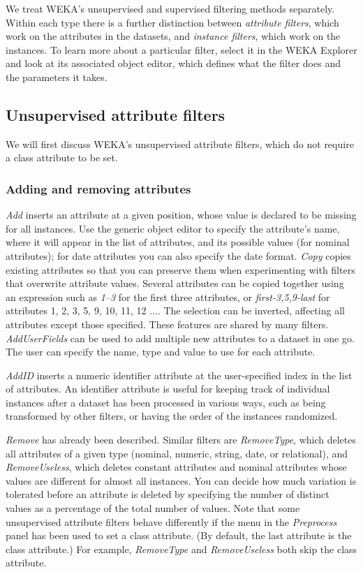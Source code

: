 We treat WEKA's unsupervised and supervised filtering methods
separately. Within each type there is a further distinction between
\textit{attribute filters}, which work on the attributes in the
datasets, and \textit{instance filters}, which work on the
instances. To learn more about a particular filter, select it in the
WEKA Explorer and look at its associated object editor, which defines
what the filter does and the parameters it takes.

\subsection{Unsupervised attribute filters}

We will first discuss WEKA's unsupervised attribute filters, which do
not require a class attribute to be set.

\subsubsection{Adding and removing attributes}

\textit{Add} inserts an attribute at a given position, whose value is
declared to be missing for all instances. Use the generic object
editor to specify the attribute's name, where it will appear in the
list of attributes, and its possible values (for nominal attributes);
for date attributes you can also specify the date
format. \textit{Copy} copies existing attributes so that you can
preserve them when experimenting with filters that overwrite attribute
values. Several attributes can be copied together using an expression
such as \textit{1–3} for the first three attributes, or
\textit{first-3,5,9-last} for attributes 1, 2, 3, 5, 9, 10, 11, 12
.... The selection can be inverted, affecting all attributes except
those specified. These features are shared by many
filters. \textit{AddUserFields} can be used to add multiple new
attributes to a dataset in one go. The user can specify the name, type
and value to use for each attribute.

\textit{AddID} inserts a numeric identifier attribute at the user-specified
index in the list of attributes. An identifier attribute is useful for
keeping track of individual instances after a dataset has been
processed in various ways, such as being transformed by other filters,
or having the order of the instances randomized.

\textit{Remove} has already been described. Similar filters are
\textit{RemoveType}, which deletes all attributes of a given type
(nominal, numeric, string, date, or relational), and
\textit{RemoveUseless}, which deletes constant attributes and nominal
attributes whose values are different for almost all instances. You
can decide how much variation is tolerated before an attribute is
deleted by specifying the number of distinct values as a percentage of
the total number of values. Note that some unsupervised attribute
filters behave differently if the menu in the \textit{Preprocess}
panel has been used to set a class attribute. (By default, the last
attribute is the class attribute.)  For example, \textit{RemoveType}
and \textit{RemoveUseless} both skip the class attribute.

